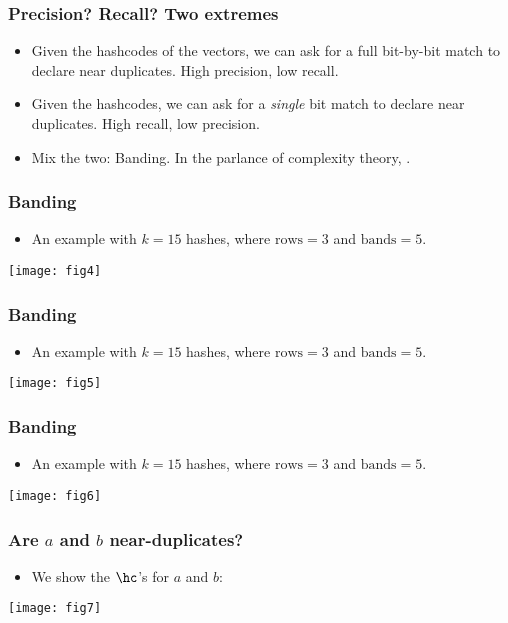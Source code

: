 \documentclass{beamer}
\begin{document}
\begin{frame}
\frametitle{Precision? Recall? Two extremes}
\begin{itemize}
\item Given the hashcodes of the vectors, we can ask for a full bit-by-bit match to declare near duplicates. High precision, low recall.
\item Given the hashcodes, we can ask for a \textit{single} bit match to declare near duplicates. High recall, low precision.
\pause
\item Mix the two: Banding. In the parlance of complexity theory, .
\end{itemize}
\end{frame}

\begin{frame}
\frametitle{Banding}
\begin{itemize}
\item An example with $k = 15$ hashes, where $\mathrm{rows} = 3$ and $\mathrm{bands} = 5$. 
\end{itemize}
\begin{center}
\texttt{[image: fig4]}
\end{center}
\end{frame}

\begin{frame}
\frametitle{Banding}
\begin{itemize}
\item An example with $k = 15$ hashes, where $\mathrm{rows} = 3$ and $\mathrm{bands} = 5$. 
\end{itemize}
\begin{center}
\texttt{[image: fig5]}
\end{center}
\end{frame}

\begin{frame}
\frametitle{Banding}
\begin{itemize}
\item An example with $k = 15$ hashes, where $\mathrm{rows} = 3$ and $\mathrm{bands} = 5$. 
\end{itemize}
\begin{center}
\texttt{[image: fig6]}
\end{center}
\end{frame}

\begin{frame}
\frametitle{Are $a$ and $b$ near-duplicates?}
\begin{itemize}
\item We show the $\hc$'s for $a$ and $b$:
\end{itemize}
\begin{center}
\texttt{[image: fig7]}
\end{center}
\end{frame}
\end{document}
